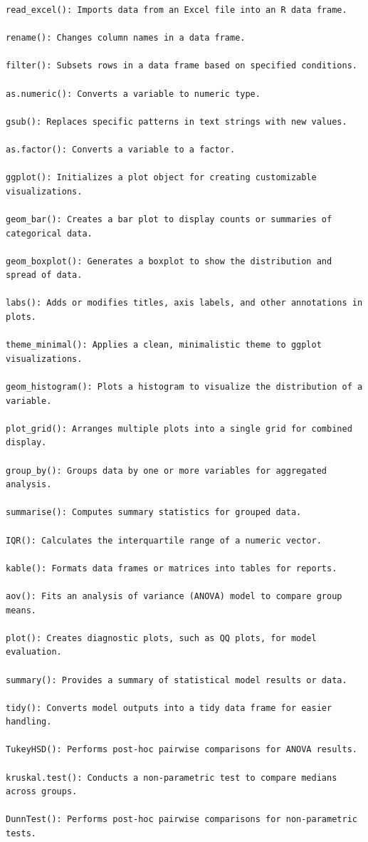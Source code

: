 \documentclass[
]{article}
\begin{document}
\begin{verbatim}
read_excel(): Imports data from an Excel file into an R data frame.

rename(): Changes column names in a data frame. 

filter(): Subsets rows in a data frame based on specified conditions. 

as.numeric(): Converts a variable to numeric type. 

gsub(): Replaces specific patterns in text strings with new values. 

as.factor(): Converts a variable to a factor. 

ggplot(): Initializes a plot object for creating customizable visualizations. 

geom_bar(): Creates a bar plot to display counts or summaries of categorical data. 

geom_boxplot(): Generates a boxplot to show the distribution and spread of data. 

labs(): Adds or modifies titles, axis labels, and other annotations in plots. 

theme_minimal(): Applies a clean, minimalistic theme to ggplot visualizations. 

geom_histogram(): Plots a histogram to visualize the distribution of a variable. 

plot_grid(): Arranges multiple plots into a single grid for combined display. 

group_by(): Groups data by one or more variables for aggregated analysis. 

summarise(): Computes summary statistics for grouped data. 

IQR(): Calculates the interquartile range of a numeric vector. 

kable(): Formats data frames or matrices into tables for reports. 

aov(): Fits an analysis of variance (ANOVA) model to compare group means. 

plot(): Creates diagnostic plots, such as QQ plots, for model evaluation. 

summary(): Provides a summary of statistical model results or data. 

tidy(): Converts model outputs into a tidy data frame for easier handling. 

TukeyHSD(): Performs post-hoc pairwise comparisons for ANOVA results. 

kruskal.test(): Conducts a non-parametric test to compare medians across groups. 

DunnTest(): Performs post-hoc pairwise comparisons for non-parametric tests.
\end{verbatim}
\end{document}
